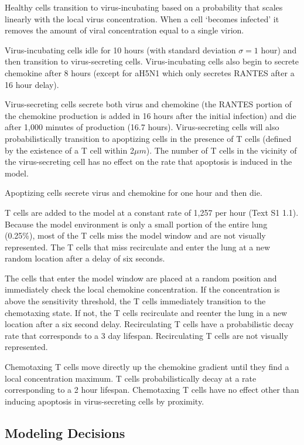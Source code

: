 \documentclass[10pt]{article}
\begin{document}
Healthy cells transition to virus-incubating based on a probability that scales linearly with the local virus concentration.   When a cell `becomes infected' it removes the amount of viral concentration equal to a single virion. 

Virus-incubating cells idle for 10 hours (with standard deviation $\sigma=1$ hour) and then transition to virus-secreting cells.  Virus-incubating cells also begin to secrete chemokine after 8 hours (except for aH5N1 which only secretes RANTES after a 16 hour delay).  

Virus-secreting cells secrete both virus and chemokine (the RANTES portion of the chemokine production is added in 16 hours after the initial infection) and die after 1,000 minutes of production (16.7 hours).  Virus-secreting cells will also probabilistically transition to apoptizing cells in the presence of T cells (defined by the existence of a T cell within 2$\mu m$).  The number of T cells in the vicinity of the virus-secreting cell has no effect on the rate that apoptosis is induced in the model.

Apoptizing cells secrete virus and chemokine for one hour and then die.

T cells are added to the model at a constant rate of 1,257 per hour (Text S1 1.1).  Because the model environment is only a small portion of the entire lung (0.25\%), most of the T cells miss the model window and are not visually represented.  The T cells that miss recirculate and enter the lung at a new random location after a delay of six seconds.

The cells that enter the model window are placed at a random position and immediately check the local chemokine concentration.  If the concentration is above the sensitivity threshold, the T cells immediately transition to the chemotaxing state.  If not, the T cells recirculate and reenter the lung in a new location after a six second delay.  Recirculating T cells have a probabilistic decay rate that corresponds to a 3 day lifespan.  Recirculating T cells are not visually represented.  

Chemotaxing T cells move directly up the chemokine gradient until they find a local concentration maximum.  T cells probabilistically decay at a rate corresponding to a 2 hour lifespan.  Chemotaxing T cells have no effect other than inducing apoptosis in virus-secreting cells by proximity.


\subsection{Modeling Decisions}
\end{document}
